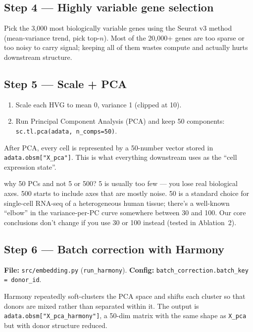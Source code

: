 \documentclass[11pt]{article}
\begin{document}
\subsection{Step 4 --- Highly variable gene selection}

Pick the 3{,}000 most biologically variable genes using the Seurat v3 method
(mean-variance trend, pick top-$n$). Most of the 20{,}000+ genes are too
sparse or too noisy to carry signal; keeping all of them wastes compute and
actually hurts downstream structure.

\subsection{Step 5 --- Scale + PCA}

\begin{enumerate}
\item Scale each HVG to mean 0, variance 1 (clipped at 10).
\item Run Principal Component Analysis (PCA) and keep 50 components:
      \texttt{sc.tl.pca(adata, n\_comps=50)}.
\end{enumerate}

After PCA, every cell is represented by a 50-number vector stored in
\texttt{adata.obsm["X\_pca"]}. This is what everything downstream uses as the
``cell expression state''.

\begin{jargon}{why 50 PCs and not 5 or 500?}
5 is usually too few --- you lose real biological axes. 500 starts to
include axes that are mostly noise. 50 is a standard choice for single-cell
RNA-seq of a heterogeneous human tissue; there's a well-known ``elbow''
in the variance-per-PC curve somewhere between 30 and 100. Our core
conclusions don't change if you use 30 or 100 instead (tested in Ablation~2).
\end{jargon}

\subsection{Step 6 --- Batch correction with Harmony}

\textbf{File:} \texttt{src/embedding.py} (\texttt{run\_harmony}).
\textbf{Config:} \texttt{batch\_correction.batch\_key = donor\_id}.

Harmony repeatedly soft-clusters the PCA space and shifts each cluster so
that donors are mixed rather than separated within it. The output is
\texttt{adata.obsm["X\_pca\_harmony"]}, a 50-dim matrix with the same shape
as \texttt{X\_pca} but with donor structure reduced.
\end{document}
